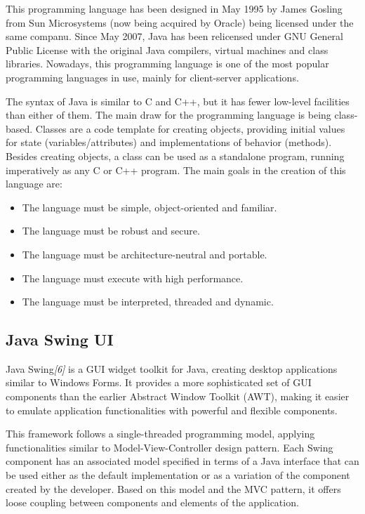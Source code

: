 \documentclass[12pt,a4paper,twoside]{report}
\begin{document}
This programming language has been designed in May 1995 by James Gosling from Sun Microsystems (now being acquired by Oracle) being licensed under the same companu. Since May 2007, Java has been relicensed under GNU General Public License with the original Java compilers, virtual machines and class libraries. Nowadays, this programming language is one of the most popular programming languages in use, mainly for client-server applications. 

The syntax of Java is similar to C and C++, but it has fewer low-level facilities than either of them. The main draw for the programming language is being class-based. Classes are a code template for creating objects, providing initial values for state (variables/attributes) and implementations of behavior (methods). Besides creating objects, a class can be used as a standalone program, running imperatively as any C or C++ program. The main goals in the creation of this language are:
\begin{itemize}
 \item The language must be simple, object-oriented and familiar.
 \item The language must be robust and secure.
 \item The language must be architecture-neutral and portable.
 \item The language must execute with high performance.
 \item The language must be interpreted, threaded and dynamic.
\end{itemize}


\subsection{Java Swing UI}

Java Swing{\it[6]} is a GUI widget toolkit for Java, creating desktop applications similar to Windows Forms. It provides a more sophisticated set of GUI components than the earlier Abstract Window Toolkit (AWT), making it easier to emulate application functionalities with powerful and flexible components. 

This framework follows a single-threaded programming model, applying functionalities similar to Model-View-Controller design pattern. Each Swing component has an associated model specified in terms of a Java interface that can be used either as the default implementation or as a variation of the component created by the developer. Based on this model and the MVC pattern, it offers loose coupling between components and elements of the application.
\end{document}
